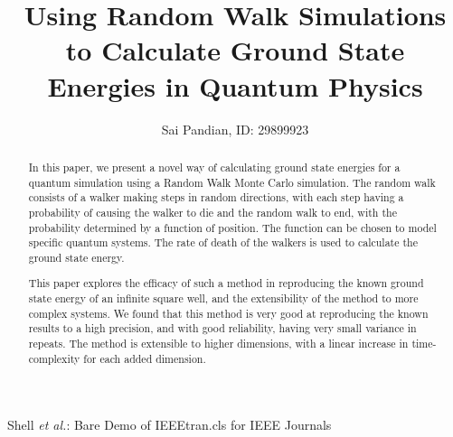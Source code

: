 \documentclass[journal]{IEEEtran}
\begin{document}
\title{Using Random Walk Simulations to Calculate Ground State Energies in
  Quantum Physics}

\author{Sai Pandian, ID: 29899923}%
        
{Shell \MakeLowercase{\textit{et al.}}: Bare Demo of IEEEtran.cls for IEEE Journals}

\maketitle

\begin{abstract}
  In this paper, we present a novel way of calculating ground state energies for
  a quantum simulation using a Random Walk Monte Carlo simulation. The random
  walk consists of a walker making steps in random directions, with each step
  having a probability of causing the walker to die and the random walk to end,
  with the probability determined by a function of position. The function can be
  chosen to model specific quantum systems. The rate of death of the walkers is
  used to calculate the ground state energy.

  This paper explores the efficacy of such a method in reproducing the known
  ground state energy of an infinite square well, and the extensibility of the
  method to more complex systems. We found that this method is very good at
  reproducing the known results to a high precision, and with good reliability,
  having very small variance in repeats. The method is extensible to higher
  dimensions, with a linear increase in time-complexity for each added dimension.
\end{abstract}
\end{document}
